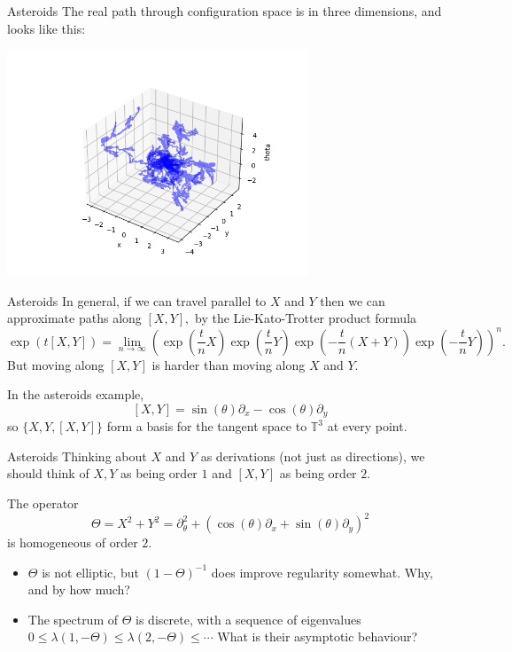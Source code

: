 \documentclass{beamer}
\numberwithin{equation}{section}
\theoremstyle{plain}
\theoremstyle{plain}
\theoremstyle{definition}
\theoremstyle{plain}
\theoremstyle{plain}
\theoremstyle{definition}
\newcommand{\Circ}{\mathbb{T}}
\begin{document}
\begin{frame}{Asteroids}
  The real path through configuration space is in three dimensions, and looks like this:
  \begin{center}
  \includegraphics[width=90mm]{xyt_coords_multiple_paths.png}
  \end{center}
\end{frame}


\begin{frame}{Asteroids}
  In general, if we can travel parallel to $X$ and $Y$ then we can approximate paths along $[X,Y],$ by the Lie-Kato-Trotter product formula
  \[
    \exp(t[X,Y]) = \lim_{n\to\infty} (\exp(\frac{t}{n}X)\exp(\frac{t}{n}Y)\exp(-\frac{t}{n}(X+Y))\exp(-\frac{t}{n}Y))^n.
  \]
  But moving along $[X,Y]$ is harder than moving along $X$ and $Y.$

  In the asteroids example,
  \[
    [X,Y] = \sin(\theta)\partial_x-\cos(\theta)\partial_y
  \]
  so $\{X,Y,[X,Y]\}$ form a basis for the tangent space to $\Circ^3$ at every point.
\end{frame}

\begin{frame}{Asteroids}
  Thinking about $X$ and $Y$ as derivations (not just as directions), we should think of $X,Y$ as being order $1$ and $[X,Y]$ as being order $2.$

  The operator
  \[
    \Theta = X^2+Y^2 = \partial_\theta^2+(\cos(\theta)\partial_x+\sin(\theta)\partial_y)^2
  \]
  is homogeneous of order $2.$
  \pause
  \begin{itemize}
    \item{} $\Theta$ is not elliptic, but $(1-\Theta)^{-1}$ does improve regularity somewhat. Why, and by how much?
    \item{} The spectrum of $\Theta$ is discrete, with a sequence of eigenvalues $0\leq \lambda(1,-\Theta) \leq \lambda(2,-\Theta) \leq \cdots$ What is their asymptotic behaviour?
  \end{itemize}
\end{frame}
\end{document}
